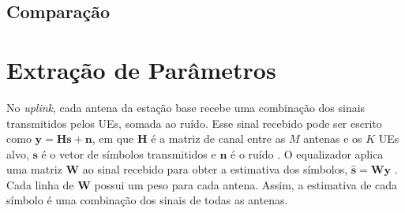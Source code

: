 \subsection{Comparação}

\section{Extração de Parâmetros}



%
%
%



No \textit{uplink}, cada antena da estação base recebe uma combinação dos sinais transmitidos pelos UEs, somada ao ruído. Esse sinal recebido pode ser escrito como $\mathbf{y}=\mathbf{H}\mathbf{s}+\mathbf{n}$, em que $\mathbf{H}$ é a matriz de canal entre as $M$ antenas e os $K$ UEs alvo, $\mathbf{s}$ é o vetor de símbolos transmitidos e $\mathbf{n}$ é o ruído \cite{zhao-lmmse}.
O equalizador aplica uma matriz $\mathbf{W}$ ao sinal recebido para obter a estimativa dos símbolos, $\hat{\mathbf{s}}=\mathbf{W}\mathbf{y}$ \cite{zhao-lmmse}.
Cada linha de $\mathbf{W}$ possui um peso para cada antena. Assim, a estimativa de cada símbolo é uma combinação dos sinais de todas as antenas.

